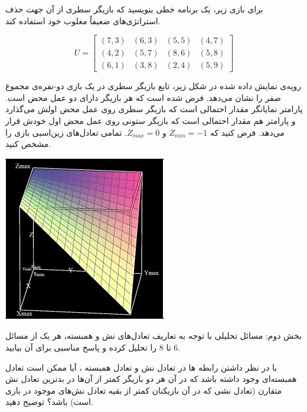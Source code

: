 \documentclass[12pt]{exam}
\theoremstyle{plain}
\theoremstyle{definition}
\theoremstyle{remark}
\begin{document}
\begin{questions}
\question
برای بازی زیر، یک برنامه خطی 
 بنویسید که بازیگر سطری از آن جهت حذف استراتژی‌های ضعیفاً مغلوب خود استفاده کند.
 
 \begin{equation*}
U = 
 \begin{bmatrix}
 (7,3) & (6,3) & (5,5) & (4,7) \\
 (4,2) & (5,7) & (8,6) & (5,8) \\
 (6,1) & (3,8) & (2,4) & (5,9)  
 \end{bmatrix}
 \end{equation*}

\question
رویه‌ی
  نمایش داده شده در شکل زیر، تابع
   بازیگر سطری در یک بازی دو-نفرە‌ی مجموع صفر را نشان می‌دهد. فرض شده است که هر بازیگر دارای دو عمل محض
   است. پارامتر  
  نمایانگر مقدار احتمالی است که
بازیگر سطری روی عمل محض اولش می‌گذارد و پارامتر
هم مقدار احتمالی است که بازیگر ستونی روی عمل محض اول خودش قرار می‌دهد.
فرض کنید که 
$Z_{min} = -1$
 و
$Z_{max} = 0$.
تمامی تعادل‌های زین‌اسبی
  بازی را مشخص کنید.


\begin{center}
    \includegraphics[width=.65\linewidth,]{hw02q5.png}
\end{center}


\newpage
\begin{mybox2}{بخش دوم: مسائل تحلیلی}
با توجه به تعاریف تعادل‌های نش و همبسته، هر یک از مسائل 6 تا 8 را تحلیل کرده و پاسخ مناسبی برای آن بیابید. 
\end{mybox2}

\question
با در نظر داشتن رابطه
ها در تعادل نش و تعادل همبسته 
،
 آیا ممکن است تعادل همبسته‌ای وجود داشته باشد که در آن 
 هر دو بازیگر کمتر از 
 آن‌ها در بدترین تعادل نش متقارن (تعادل نشی که در آن 
 بازیکنان کمتر از بقیه تعادل نش‌های موجود در بازی است)  باشد؟  توضیح دهید.


\end{questions}
\end{document}
